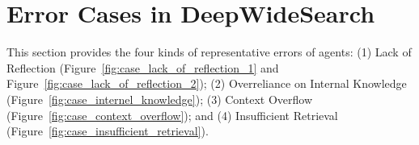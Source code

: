 \documentclass[11pt, letterpaper, logo, onecolumn, copyright, numbering]{paper_improved}
\begin{document}
\newpage

\section{Error Cases in DeepWideSearch}
\label{sec:case}


This section provides the four kinds of representative errors of agents: (1) Lack of Reflection (Figure~\ref{fig:case_lack_of_reflection_1} and Figure~\ref{fig:case_lack_of_reflection_2}); (2) Overreliance on Internal Knowledge (Figure~\ref{fig:case_internel_knowledge}); (3) Context Overflow (Figure~\ref{fig:case_context_overflow}); and (4) Insufficient Retrieval (Figure~\ref{fig:case_insufficient_retrieval}).
\end{document}
